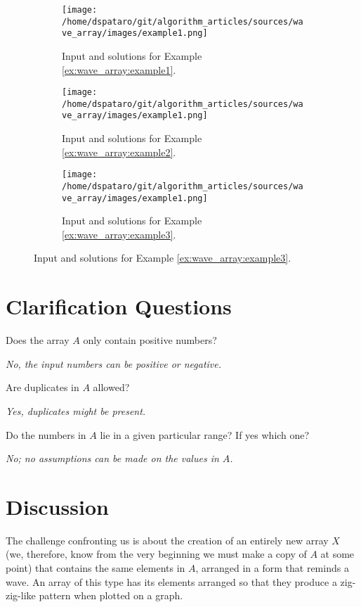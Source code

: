 \begin{figure}
	\centering
	\begin{subfigure}[t]{0.80\textwidth}
		\texttt{[image: /home/dspataro/git/algorithm\_articles/sources/wave\_array/images/example1.png]}
		\caption{Input and solutions for Example \ref{ex:wave_array:example1}.}
		\label{fig:dice_rolls:12faces_dice}
	 \end{subfigure}
	\hfill
	\begin{subfigure}[t]{0.80\textwidth}
		\texttt{[image: /home/dspataro/git/algorithm\_articles/sources/wave\_array/images/example1.png]}
		\caption{Input and solutions for Example \ref{ex:wave_array:example2}.}
		\label{fig:dice_rolls:6faces_dice}
	 \end{subfigure}
	 \hfill
	 \begin{subfigure}[t]{0.80\textwidth}
		 \texttt{[image: /home/dspataro/git/algorithm\_articles/sources/wave\_array/images/example1.png]}
		 \caption{Input and solutions for Example \ref{ex:wave_array:example3}.}
		 \label{fig:dice_rolls:20faces_dice}
	  \end{subfigure}
\end{figure}


\section{Clarification Questions}

\begin{QandA}
	\item Does the array $A$ only contain positive numbers?
	\begin{answered}
		\textit{No, the input numbers can be positive or negative.}
	\end{answered}
	\item Are duplicates in $A$ allowed?
	\begin{answered}
		\textit{Yes, duplicates might be present.}
	\end{answered}
	\item Do the numbers in $A$ lie in a given particular range? If yes which one?
	\begin{answered}
		\textit{No; no assumptions can be made on the values in $A$.}
	\end{answered}
\end{QandA}

\section{Discussion}
\label{wave_array:sec:discussion}
The challenge confronting us is about the creation of an entirely new array $X$ (we, therefore, know from the very beginning we must make a copy of $A$ at some point) that contains the same elements in $A$, arranged in a form that reminds a wave. 
An array of this type has its elements arranged so that they produce a zig-zig-like pattern when plotted on a graph. 

